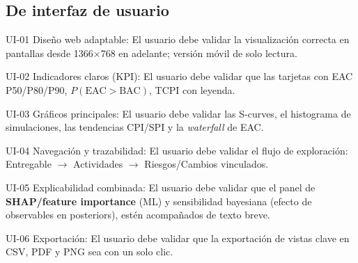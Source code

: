 \documentclass[12pt]
{charter}
\begin{document}
\subsection{De interfaz de usuario}
\begin{description}
  \item UI-01 Diseño web adaptable: El usuario debe validar la visualización correcta en pantallas desde 1366$\times$768 en adelante; versión móvil de solo lectura.

  \item UI-02 Indicadores claros (KPI): El usuario debe validar que las tarjetas con EAC P50/P80/P90, $P(\text{EAC}>\text{BAC})$, TCPI con leyenda.

  \item UI-03 Gráficos principales: El usuario debe validar las S-curves, el histograma de simulaciones, las tendencias CPI/SPI y la \textit{waterfall} de EAC.

  \item UI-04 Navegación y trazabilidad: El usuario debe validar el flujo de exploración: Entregable $\rightarrow$ Actividades $\rightarrow$ Riesgos/Cambios vinculados.

  \item UI-05 Explicabilidad combinada: El usuario debe validar que el panel de \textbf{SHAP/feature importance} (ML) y sensibilidad bayesiana (efecto de observables en posteriors), estén acompañados de texto breve.

   \item UI-06 Exportación: El usuario debe validar que la exportación de vistas clave en CSV, PDF y PNG sea con un solo clic.

\end{description}
\end{document}
